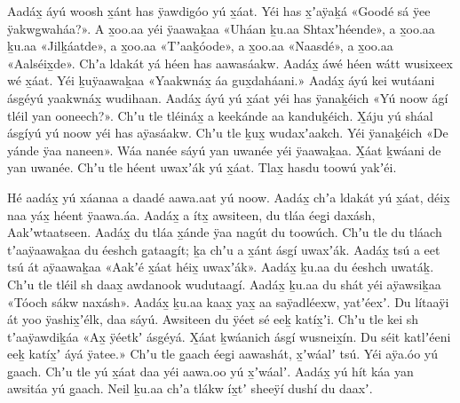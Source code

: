 \begin{pairs}
\begin{Leftside}
\pstart
{}Aadáx̱ áyú woosh x̱ánt has ÿawdigóo yú x̱áat.
Yéi has x̱ʼaÿaḵá
«\!Goodé sá ÿee ÿakw\-g̱waháa?\!».
A x̱oo.aa yéi ÿaawaḵaa «\!Uháan ḵu.aa Shtaxʼhéende\!»,
a x̱oo.aa ḵu.aa «\!Jil\-ḵáatde\!»,
a x̱oo.aa «\!Tʼaaḵóode\!»,
a x̱oo.aa «\!Naasdé\!»,
a x̱oo.aa «\!Aalséix̱de\!».
Chʼa ldakát yá héen has aawasáakw.
Aadáx̱ áwé héen wátt wusixeex wé x̱áat. 
Yéi ḵuÿaawa\-ḵaa
«\!Yaakwnáx̱ áa gux̱daháani.\!»
Aadáx̱ áyú kei wutáani ásgéyú yaakwnáx̱ wudihaan.
Aadáx̱ áyú yú x̱áat yéi has ÿanaḵéich
«\!Yú noow ágí tléil yan ooneech?\!».
Chʼu tle tléináx̱ a keekánde aa kanduḵéich.
X̱áju yú sháal ásgíyú yú noow yéi has aÿasáakw.
Chʼu tle ḵux̱ wudaxʼaakch.
Yéi ÿanaḵéich
«\!De yánde ÿaa naneen\!».
Wáa nanée sáyú yan uwanée yéi ÿaawaḵaa.
X̱áat ḵwáani de yan uwanée.
Chʼu tle héent uwaxʼák yú x̱áat.
Tlax̱ hasdu toowú yakʼéi.
\pend

\pstart
{}Hé aadáx̱ yú xáanaa a daadé aawa.aat yú noow.
Aadáx̱ chʼa ldakát yú x̱áat, déix̱ naa yáx̱ héent ÿaawa.áa.
Aadáx̱ a ítx̱ awsiteen, du tláa éeg̱i daxásh, Aakʼwtaatseen.
Aadáx̱ du tláa x̱ánde ÿaa nagút du toowúch.
Chʼu tle du tláach tʼaaÿaawaḵaa du éeshch g̱ataa\-g̱ít;
ḵa chʼu a x̱ánt ásgí uwaxʼák.
Aadáx̱ tsú a eet tsú át aÿaawaḵaa
«\!Aakʼé x̱áat héix̱ uwaxʼák\!».
Aadáx̱ ḵu.aa du éeshch uwatáḵ.
Chʼu tle tléil sh daax̱ awdanook wudutaag̱í.
Aadáx̱ ḵu.aa du shát yéi aÿawsiḵaa
«\!Tóo\-ch sákw naxásh\!».
Aadáx̱ ḵu.aa kaax̱ yax̱ aa saÿadléexw, yatʼéexʼ.
Du lítaaÿi át yoo ÿashix̱ʼélk, daa sáyú.
Awsiteen du ÿéet sé eeḵ katíx̱ʼi.
Chʼu tle kei sh tʼaaÿawdiḵáa
«\!Ax̱ ÿéetkʼ ásgéyá.
X̱áat ḵwáanich ásgí wusneix̱ín.
Du séit katlʼéeni eeḵ katíx̱ʼ áyá ÿatee.\!»
\hspace{-0.125ex}Chʼu tle g̱aach éeg̱i aawashát, x̱ʼwáalʼ tsú.
Yéi aÿa.óo yú g̱aach.
Chʼu tle yú x̱áat daa yéi aawa.oo yú x̱ʼwáalʼ.
Aadáx̱ yú hít káa yan awsitáa yú g̱aach.
Neil ḵu.aa chʼa tlákw íx̱tʼ sheeÿí dushí du daaxʼ.
\pend


\end{Leftside}
\end{pairs}
